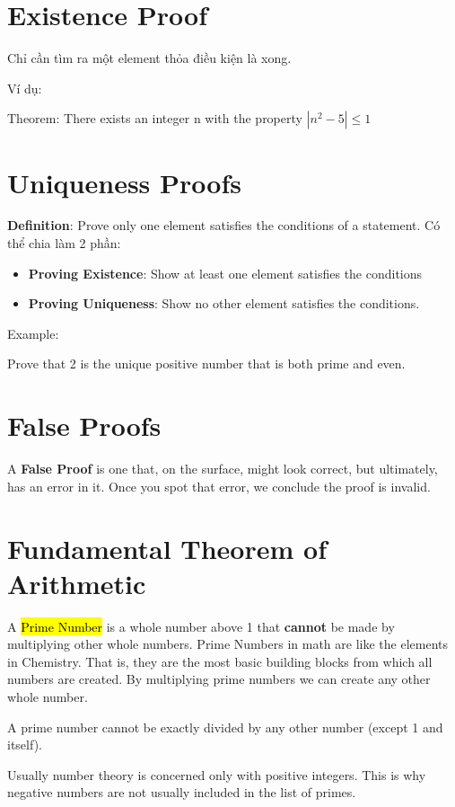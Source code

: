 \section{Existence Proof}

Chỉ cần tìm ra một element thỏa điều kiện là xong.

Ví dụ:

Theorem: There exists an integer n with the property $|n^{2}-5| \leq 1$

\section{Uniqueness Proofs}

\textbf{Definition}: Prove only one element satisfies the conditions of a statement. Có thể chia làm 2 phần:

\begin{itemize}
  \item \textbf{Proving Existence}: Show at least one element satisfies the conditions
  \item \textbf{Proving Uniqueness}: Show no other element satisfies the conditions.
\end{itemize}

Example:

Prove that 2 is the unique positive number that is both prime and even.

\section{False Proofs}

A \textbf{False Proof} is one that, on the surface, might look correct, but ultimately, has an error in it. Once you spot that error, we conclude the proof is invalid.

\section{Fundamental Theorem of Arithmetic}

A \hl{Prime Number} is a whole number above 1 that \textbf{cannot} be made by multiplying other whole numbers. Prime Numbers in math are like the elements in Chemistry. That is, they are the most basic building blocks from which all numbers are created. By multiplying prime numbers we can create any other whole number.

A prime number cannot be exactly divided by any other number (except 1 and itself).

Usually number theory is concerned only with positive integers. This is why negative numbers are not usually included in the list of primes.

